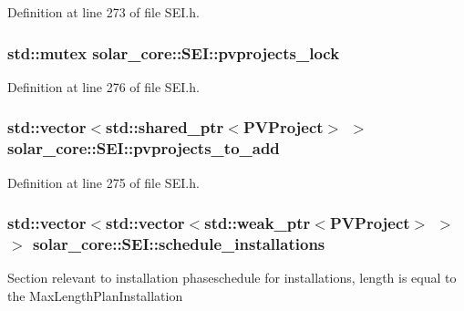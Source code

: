 Definition at line 273 of file S\+E\+I.\+h.

\hypertarget{classsolar__core_1_1_s_e_i_adc031a01a6acf03d68b6d0037a2c8a30}{}
\subsubsection[{pvprojects\+\_\+lock}]{\setlength{\rightskip}{0pt plus 5cm}std\+::mutex solar\+\_\+core\+::\+S\+E\+I\+::pvprojects\+\_\+lock\hspace{0.3cm}{\ttfamily [protected]}}\label{classsolar__core_1_1_s_e_i_adc031a01a6acf03d68b6d0037a2c8a30}


Definition at line 276 of file S\+E\+I.\+h.

\hypertarget{classsolar__core_1_1_s_e_i_a99fe003b8fd35b6ef44dec39ed374ffe}{}
\subsubsection[{pvprojects\+\_\+to\+\_\+add}]{\setlength{\rightskip}{0pt plus 5cm}std\+::vector$<$std\+::shared\+\_\+ptr$<${\bf P\+V\+Project}$>$ $>$ solar\+\_\+core\+::\+S\+E\+I\+::pvprojects\+\_\+to\+\_\+add\hspace{0.3cm}{\ttfamily [protected]}}\label{classsolar__core_1_1_s_e_i_a99fe003b8fd35b6ef44dec39ed374ffe}


Definition at line 275 of file S\+E\+I.\+h.

\hypertarget{classsolar__core_1_1_s_e_i_aacda4fae2c17d58672b60eba9c8cdc63}{}
\subsubsection[{schedule\+\_\+installations}]{\setlength{\rightskip}{0pt plus 5cm}std\+::vector$<$std\+::vector$<$std\+::weak\+\_\+ptr$<${\bf P\+V\+Project}$>$ $>$ $>$ solar\+\_\+core\+::\+S\+E\+I\+::schedule\+\_\+installations\hspace{0.3cm}{\ttfamily [protected]}}\label{classsolar__core_1_1_s_e_i_aacda4fae2c17d58672b60eba9c8cdc63}
Section relevant to installation phaseschedule for installations, length is equal to the Max\+Length\+Plan\+Installation 


